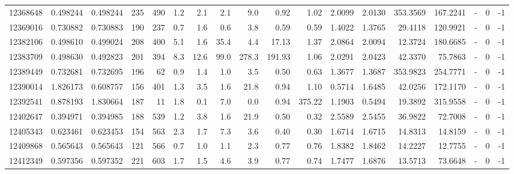 \begin{tabular}{rrrrrrrrrrrrrrrlrr}
  12368648 & 0.498244 &   0.498244 &  235 &  490 &      1.2 &      2.1 &     2.1 &      9.0 &       0.92 &        1.02 &  2.0099 &  2.0130 &  353.3569 &  167.2241 &             - &        0 &         -1 \\
  12369016 & 0.730882 &   0.730883 &  190 &  237 &      0.7 &      1.6 &     0.6 &      3.8 &       0.59 &        0.59 &  1.4022 &  1.3765 &   29.4118 &  120.9921 &             - &        0 &         -1 \\
  12382106 & 0.498610 &   0.499024 &  208 &  400 &      5.1 &      1.6 &    35.4 &      4.4 &      17.13 &        1.37 &  2.0864 &  2.0094 &   12.3724 &  180.6685 &             - &        0 &         -1 \\
  12383709 & 0.498630 &   0.492823 &  201 &  394 &      8.3 &     12.6 &    99.0 &    278.3 &     191.93 &        1.06 &  2.0291 &  2.0423 &   42.3370 &   75.7863 &             - &        0 &         -1 \\
  12389449 & 0.732681 &   0.732695 &  196 &   62 &      0.9 &      1.4 &     1.0 &      3.5 &       0.50 &        0.63 &  1.3677 &  1.3687 &  353.9823 &  254.7771 &             - &        0 &         -1 \\
  12390014 & 1.826173 &   0.608757 &  156 &  401 &      1.3 &      3.5 &     1.6 &     21.8 &       0.94 &        1.10 &  0.5714 &  1.6485 &   42.0256 &  172.1170 &             - &        0 &         -1 \\
  12392541 & 0.878193 &   1.830664 &  187 &   11 &      1.8 &      0.1 &     7.0 &      0.0 &       0.94 &      375.22 &  1.1903 &  0.5494 &   19.3892 &  315.9558 &             - &        0 &         -1 \\
  12402647 & 0.394971 &   0.394985 &  188 &  539 &      1.2 &      3.8 &     1.6 &     21.9 &       0.50 &        0.32 &  2.5589 &  2.5455 &   36.9822 &   72.7008 &             - &        0 &         -1 \\
  12405343 & 0.623461 &   0.623453 &  154 &  563 &      2.3 &      1.7 &     7.3 &      3.6 &       0.40 &        0.30 &  1.6714 &  1.6715 &   14.8313 &   14.8159 &             - &        0 &         -1 \\
  12409868 & 0.565643 &   0.565643 &  121 &  566 &      0.7 &      1.0 &     1.1 &      2.3 &       0.77 &        0.76 &  1.8382 &  1.8462 &   14.2227 &   12.7755 &             - &        0 &         -1 \\
  12412349 & 0.597356 &   0.597352 &  221 &  603 &      1.7 &      1.5 &     4.6 &      3.9 &       0.77 &        0.74 &  1.7477 &  1.6876 &   13.5713 &   73.6648 &             - &        0 &         -1 \\

\end{tabular}

